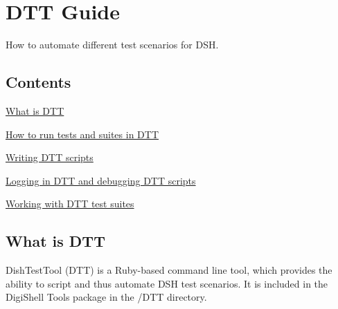 \hypertarget{a00366}{}\section{D\+T\+T Guide}
\label{a00366}
How to automate different test scenarios for D\+S\+H. 

\hypertarget{a00366_dtt_guide_contents}{}\subsection{Contents}\label{a00366_dtt_guide_contents}
\begin{DoxyItemize}
\item \hyperlink{a00366_dtt_guide_00_what_is_dtt}{What is D\+T\+T} \item \hyperlink{a00366_dtt_guide_01_how_to_run_test_and_suites_in_dtt}{How to run tests and suites in D\+T\+T} \item \hyperlink{a00366_dtt_guide_03_writing_dtt_scripts}{Writing D\+T\+T scripts} \item \hyperlink{a00366_dtt_guide_04_logging_in_dtt_and_debuggin_dtt_scripts}{Logging in D\+T\+T and debugging D\+T\+T scripts} \item \hyperlink{a00366_dtt_guide_02_working_with_dtt_test_suites}{Working with D\+T\+T test suites}\end{DoxyItemize}
 \hypertarget{a00366_dtt_guide_00_what_is_dtt}{}\subsection{What is D\+T\+T}\label{a00366_dtt_guide_00_what_is_dtt}
 Dish\+Test\+Tool (D\+T\+T) is a Ruby-\/based command line tool, which provides the ability to script and thus automate D\+S\+H test scenarios. It is included in the Digi\+Shell Tools package in the /\+D\+T\+T directory.

